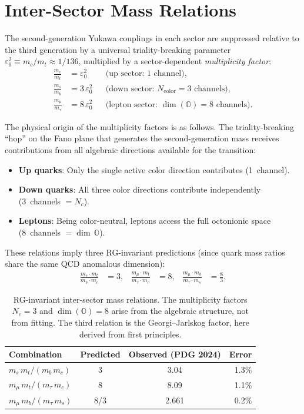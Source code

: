 \documentclass[12pt,a4paper]{article}
\theoremstyle{definition}
\theoremstyle{remark}
\newcommand{\Oct}{\mathbb{O}}
\begin{document}
\section{Inter-Sector Mass Relations}
\label{sec:mass_relations}

The second-generation Yukawa couplings in each sector are suppressed relative 
to the third generation by a universal triality-breaking parameter 
$\varepsilon_0^2 \equiv m_c/m_t \approx 1/136$, multiplied by a 
sector-dependent \emph{multiplicity factor}:
\begin{align}
\frac{m_c}{m_t} &= \varepsilon_0^2 & &\text{(up sector: 1 channel)}, \\
\frac{m_s}{m_b} &= 3\,\varepsilon_0^2 & &\text{(down sector: }N_{\text{color}} = 3\text{ channels)}, \\
\frac{m_\mu}{m_\tau} &= 8\,\varepsilon_0^2 & &\text{(lepton sector: }\dim(\Oct) = 8\text{ channels)}.
\end{align}

The physical origin of the multiplicity factors is as follows. The 
triality-breaking ``hop'' on the Fano plane that generates the 
second-generation mass receives contributions from all algebraic directions 
available for the transition:
\begin{itemize}
\item \textbf{Up quarks}: Only the single active color direction contributes 
      (1~channel).
\item \textbf{Down quarks}: All three color directions contribute independently 
      (3~channels $= N_c$).
\item \textbf{Leptons}: Being color-neutral, leptons access the full octonionic 
      space (8~channels $= \dim\,\Oct$).
\end{itemize}

These relations imply three RG-invariant predictions (since quark mass ratios 
share the same QCD anomalous dimension):
\begin{align}
\frac{m_s \cdot m_t}{m_b \cdot m_c} &= 3, &
\frac{m_\mu \cdot m_t}{m_\tau \cdot m_c} &= 8, &
\frac{m_\mu \cdot m_b}{m_\tau \cdot m_s} &= \frac{8}{3}.
\end{align}

\begin{table}[h]
\centering
\begin{tabular}{@{}lccr@{}}
\toprule
Combination & Predicted & Observed (PDG 2024) & Error \\
\midrule
$m_s\,m_t / (m_b\,m_c)$ & 3 & 3.04 & 1.3\% \\
$m_\mu\,m_t / (m_\tau\,m_c)$ & 8 & 8.09 & 1.1\% \\
$m_\mu\,m_b / (m_\tau\,m_s)$ & 8/3 & 2.661 & 0.2\% \\
\bottomrule
\end{tabular}
\caption{RG-invariant inter-sector mass relations. The multiplicity factors 
$N_c = 3$ and $\dim(\Oct) = 8$ arise from the algebraic structure, not from 
fitting. The third relation is the Georgi--Jarlskog factor, here derived from 
first principles.}
\label{tab:mass_relations}
\end{table}
\end{document}
